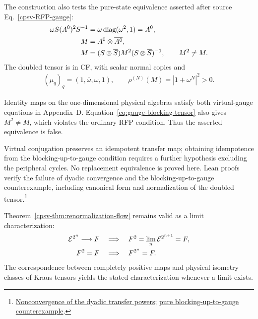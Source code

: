 \documentclass[aps,pra,reprint,nofootinbib,onecolumn]{revtex4-2}
\begin{document}
The construction also tests the pure-state equivalence asserted after source
Eq.~\eqref{cpsv-RFP-gauge}:
\begin{align}
	\omega S(A^0)^2S^{-1} & =\omega\operatorname{diag}(\omega^2,1)=A^0,\nonumber               \\
	M                     & =A^0\otimes\overline{A^0},\nonumber                  \\
	M                     & =(S\otimes\overline S)M^2(S\otimes\overline S)^{-1},
	\qquad M^2\ne M.
	\label{eq:gauge-blocking-tensor}
\end{align}
The doubled tensor is in CF, with scalar normal copies and
\begin{align}
	(\mu_q)_q=(1,\overline\omega,\omega,1),
	\qquad \rho^{(N)}(M)=|1+\omega^N|^2>0.
	\label{eq:doubled-weights}
\end{align}
\begin{refutation}
	Identity maps on the one-dimensional physical algebras satisfy both
	virtual-gauge equations in Appendix~D. Equation~\eqref{eq:gauge-blocking-tensor}
	also gives $M^2\ne M$, which violates the ordinary RFP condition.
	Thus the asserted equivalence is false.
\end{refutation} Virtual conjugation preserves an
idempotent transfer map; obtaining idempotence from the blocking-up-to-gauge
condition requires a further hypothesis excluding the peripheral cycles.
No replacement equivalence is proved here.
Lean proofs verify the failure of dyadic convergence and the
blocking-up-to-gauge counterexample, including canonical form and
normalization of the doubled tensor.\footnote{\href{https://sirui-lu.com/TNLean/docs/TNLean/MPS/RFP/PhaseOscillation.html\#MPSTensor.cubePhaseTensor_not_tendsto_dyadic_transferMap}{Nonconvergence of the dyadic transfer powers}; \href{https://sirui-lu.com/TNLean/docs/TNLean/MPS/RFP/GaugeBlockingCounterexample.html\#MPSTensor.cpsv16_pure_rfp_gauge_equivalence_false}{pure blocking-up-to-gauge counterexample}.}

Theorem~\ref{cpsv-thm:renormalization-flow} remains valid as a
limit characterization:
\begin{align}
	\mathcal{E}^{2^n}\longrightarrow F
	      & \quad\Longrightarrow\quad
	F^2=\lim_n\mathcal{E}^{2^{n+1}}=F,\nonumber        \\
	F^2=F & \quad\Longrightarrow\quad F^{2^n}=F.
	\label{eq:limit-characterization}
\end{align}
The correspondence between completely positive maps and physical
isometry classes of Kraus tensors yields the stated characterization
whenever a limit exists.
\end{document}
